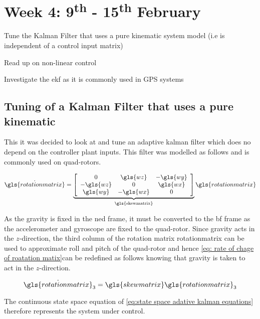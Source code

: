 \chapter{Week 4: 9\textsuperscript{th} - 15\textsuperscript{th} February }

\begin{itemize*}
	\item Tune the Kalman Filter that uses a pure kinematic system model (i.e is independent of a control input matrix)
	\item Read up on non-linear control
	\item  Investigate the \gls{ekf} as it is commonly used in GPS systems 
\end{itemize*}

 \tocless\section{Tuning of a Kalman Filter that uses a pure kinematic}
This it was decided  to look at and tune an adaptive kalman filter which  does no depend on the controller  plant inputs. This filter was modelled as follows and is commonly used on quad-rotors.

 \begin{equation}
 \dot{\gls{rotationmatrix}}=  \underbrace{\left[\begin{array}{ccc} 0 & \gls{wz} & -\gls{wy}\\ -\gls{wz} & 0 & \gls{wx}\\ \gls{wy}&-\gls{wx} & 0 \end{array}\right] }_{\text{\gls{skewmatrix}}} \gls{rotationmatrix} \label{eq: rate of chage of roatation matix}
 \end{equation} 

As the gravity is fixed in the \gls{ned} frame, it must be converted to the \gls{bf} frame as the accelerometer and gyroscope are fixed to the quad-rotor. Since gravity acts in the $z$-direction, the third column of the rotation matrix \gls{rotationmatrix} can be used to approximate \gls{roll} and \gls{pitch} of the quad-rotor and hence \eqref{eq: rate of chage of roatation matix}can be redefined as follows knowing that gravity is taken to act in the $z$-direction.

\begin{equation}
\dot{\gls{rotationmatrix}}_3=  \gls{skewmatrix} \gls{rotationmatrix}_{3}\label{eq: adtive kalman eqautions}
\end{equation}

The continuous state space equation of \eqref{eq:state space adative kalman equations} therefore represents the system under control.

